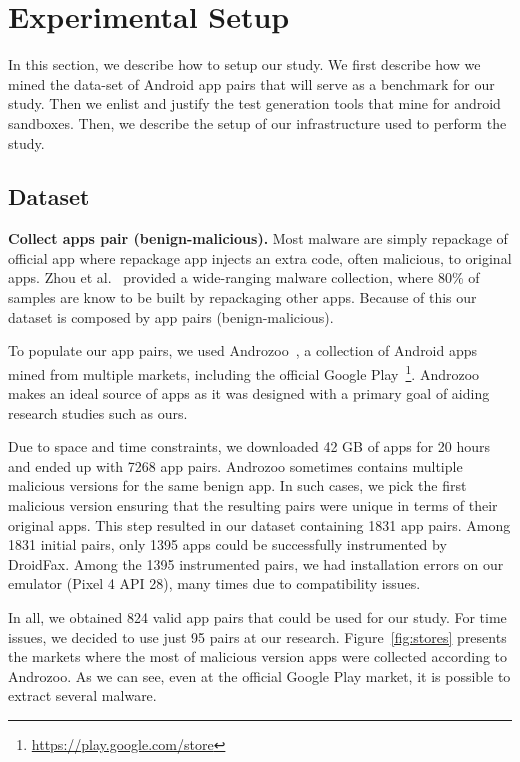 \section{Experimental Setup}\label{sec:experimentalSetup}

In this section, we describe how to setup our study. We first describe how we mined the data-set of Android app pairs that will serve as a benchmark for our study. Then we enlist and justify the test generation tools that mine for android sandboxes. Then, we describe the setup of our infrastructure used to perform the study.

\subsection{Dataset}
\textbf{Collect apps pair (benign-malicious).} Most malware are simply repackage of official app where repackage app injects an extra code, often malicious, to original apps. Zhou et al.~\cite{DBLP:conf/sp/ZhouJ12} provided a wide-ranging malware collection, where 80\% of samples are know to be built by repackaging other apps. Because of this our dataset is composed by app pairs (benign-malicious).


To populate our app pairs, we used Androzoo~\cite{DBLP:conf/msr/AllixBKT16}, a collection of Android apps mined from multiple markets, including the official Google Play~\footnote{\url{https://play.google.com/store}}. Androzoo makes an ideal source of apps as it was designed with a primary goal of aiding research studies such as ours. 

Due to space and time constraints, we downloaded 42 GB of apps for 20 hours and ended up with 7268 app pairs. Androzoo sometimes contains multiple malicious versions for the same benign app. In such cases, we pick the first malicious version ensuring that the resulting pairs were unique in terms of their original apps. This step resulted in our dataset containing 1831 app pairs. Among 1831 initial pairs, only 1395 apps could be successfully instrumented by DroidFax. Among the 1395 instrumented pairs, we had installation errors on our emulator (Pixel 4 API 28), many times due to compatibility issues. 

In all, we obtained 824 valid app pairs that could be used for our study. For time issues, we decided to use just 95 pairs at our research. Figure~\ref{fig:stores} presents the markets where the most of malicious version apps were collected according to Androzoo. As we can see, even at the official Google Play market, it is possible to extract several malware.


